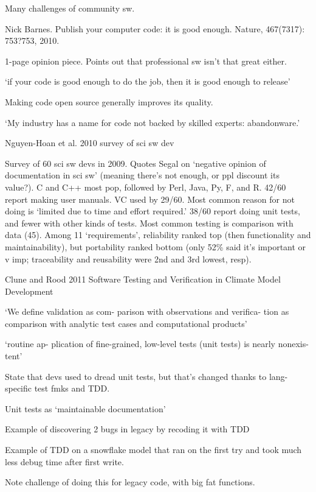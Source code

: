 \documentclass[12pt]{amsart}
\begin{document}
Many challenges of community sw.


Nick Barnes. Publish your computer code: it is good enough. Nature, 467(7317): 753?753, 2010.

1-page opinion piece. Points out that professional sw isn't that great either.

`if your code is good enough to do the job, then it is good enough to release'

Making code open source generally improves its quality. 

`My industry has a name for code not backed by skilled experts: abandonware.'


Nguyen-Hoan et al. 2010 survey of sci sw dev

Survey of 60 sci sw devs in 2009. Quotes Segal on `negative opinion of documentation in sci sw' (meaning there's not enough, or ppl discount its value?). C and C++ most pop, followed by Perl, Java, Py, F, and R. 42/60 report making user manuals. VC used by 29/60. Most common reason for not doing is `limited due to time and effort required.' 38/60 report doing unit tests, and fewer with other kinds of tests. Most common testing is comparison with data (45). Among 11 `requirements', reliability ranked top (then functionality and maintainability), but portability ranked bottom (only 52\% said it's important or v imp; traceability and reusability were 2nd and 3rd lowest, resp).



Clune and Rood 2011 Software Testing and Verification in Climate Model Development


`We define validation as com- parison with observations and verifica- tion as comparison with analytic test cases and computational products'

`routine ap- plication of fine-grained, low-level tests (unit tests) is nearly nonexis- tent'

State that devs used to dread unit tests, but that's changed thanks to lang-specific test fmks and TDD.

Unit tests as `maintainable documentation'

Example of discovering 2 bugs in legacy by recoding it with TDD

Example of TDD on a snowflake model that ran on the first try and took much less debug time after first write.

Note challenge of doing this for legacy code, with big fat functions.
\end{document}
